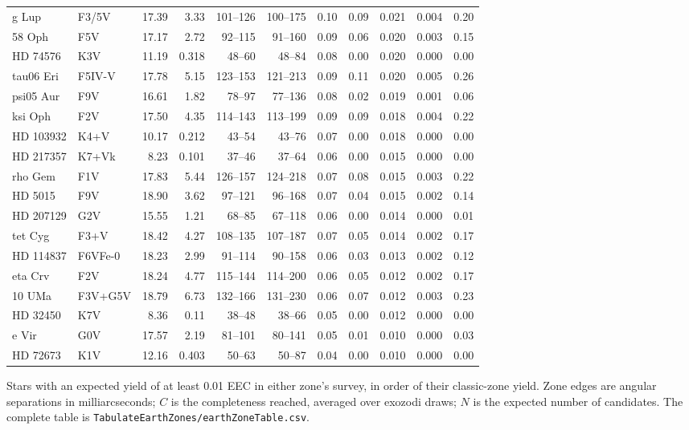 \documentclass[11pt,a4paper]{article}
\begin{document}
{\begin{longtable}{llrrrrrrrrr}
g Lup & F3/5V & 17.39 & 3.33 & 101--126 & 100--175 & 0.10 & 0.09 & 0.021 & 0.004 & 0.20 \\
58 Oph & F5V & 17.17 & 2.72 & 92--115 & 91--160 & 0.09 & 0.06 & 0.020 & 0.003 & 0.15 \\
HD  74576 & K3V & 11.19 & 0.318 & 48--60 & 48--84 & 0.08 & 0.00 & 0.020 & 0.000 & 0.00 \\
tau06 Eri & F5IV-V & 17.78 & 5.15 & 123--153 & 121--213 & 0.09 & 0.11 & 0.020 & 0.005 & 0.26 \\
psi05 Aur & F9V & 16.61 & 1.82 & 78--97 & 77--136 & 0.08 & 0.02 & 0.019 & 0.001 & 0.06 \\
ksi Oph & F2V & 17.50 & 4.35 & 114--143 & 113--199 & 0.09 & 0.09 & 0.018 & 0.004 & 0.22 \\
HD 103932 & K4+V & 10.17 & 0.212 & 43--54 & 43--76 & 0.07 & 0.00 & 0.018 & 0.000 & 0.00 \\
HD 217357 & K7+Vk & 8.23 & 0.101 & 37--46 & 37--64 & 0.06 & 0.00 & 0.015 & 0.000 & 0.00 \\
rho Gem & F1V & 17.83 & 5.44 & 126--157 & 124--218 & 0.07 & 0.08 & 0.015 & 0.003 & 0.22 \\
HD   5015 & F9V & 18.90 & 3.62 & 97--121 & 96--168 & 0.07 & 0.04 & 0.015 & 0.002 & 0.14 \\
HD 207129 & G2V & 15.55 & 1.21 & 68--85 & 67--118 & 0.06 & 0.00 & 0.014 & 0.000 & 0.01 \\
tet Cyg & F3+V & 18.42 & 4.27 & 108--135 & 107--187 & 0.07 & 0.05 & 0.014 & 0.002 & 0.17 \\
HD 114837 & F6VFe-0 & 18.23 & 2.99 & 91--114 & 90--158 & 0.06 & 0.03 & 0.013 & 0.002 & 0.12 \\
eta Crv & F2V & 18.24 & 4.77 & 115--144 & 114--200 & 0.06 & 0.05 & 0.012 & 0.002 & 0.17 \\
10 UMa & F3V+G5V & 18.79 & 6.73 & 132--166 & 131--230 & 0.06 & 0.07 & 0.012 & 0.003 & 0.23 \\
HD  32450 & K7V & 8.36 & 0.11 & 38--48 & 38--66 & 0.05 & 0.00 & 0.012 & 0.000 & 0.00 \\
e Vir & G0V & 17.57 & 2.19 & 81--101 & 80--141 & 0.05 & 0.01 & 0.010 & 0.000 & 0.03 \\
HD  72673 & K1V & 12.16 & 0.403 & 50--63 & 50--87 & 0.04 & 0.00 & 0.010 & 0.000 & 0.00 \\
\bottomrule
\end{longtable}
}

Stars with an expected yield of at least 0.01 EEC in either zone's survey, in order of
their classic-zone yield. Zone edges are angular separations in milliarcseconds; $C$ is the
completeness reached, averaged over exozodi draws; $N$ is the expected number of candidates. The
complete table is \texttt{TabulateEarthZones/earthZoneTable.csv}.
\end{document}
